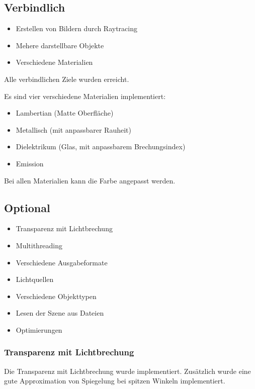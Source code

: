 \documentclass[a4paper, 10pt]{article}
\begin{document}
\subsection{Verbindlich}

\begin{itemize}
    \item Erstellen von Bildern durch Raytracing
    \item Mehere darstellbare Objekte
    \item Verschiedene Materialien
\end{itemize}

Alle verbindlichen Ziele wurden erreicht.

Es sind vier verschiedene Materialien implementiert:
\begin{itemize}
    \item Lambertian (Matte Oberfläche)
    \item Metallisch (mit anpassbarer Rauheit)
    \item Dielektrikum (Glas, mit anpassbarem Brechungsindex)
    \item Emission
\end{itemize}
Bei allen Materialien kann die Farbe angepasst werden.

\subsection{Optional}

\begin{itemize}
    \item Transparenz mit Lichtbrechung
    \item Multithreading
    \item Verschiedene Ausgabeformate
    \item Lichtquellen
    \item Verschiedene Objekttypen
    \item Lesen der Szene aus Dateien
    \item Optimierungen 
\end{itemize}

\subsubsection*{Transparenz mit Lichtbrechung}

Die Transparenz mit Lichtbrechung wurde implementiert.
Zusätzlich wurde eine gute Approximation von Spiegelung bei spitzen Winkeln implementiert.
\end{document}
